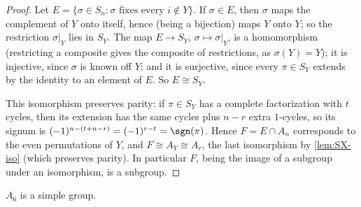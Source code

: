 \begin{proof}
	Let \(E = \{\sigma \in S_n : \sigma \text{ fixes every } i \notin Y\}\). If
	\(\sigma \in E\), then \(\sigma\) maps the complement of \(Y\) onto itself, hence (being
	a bijection) maps \(Y\) onto \(Y\); so the restriction \(\sigma|_Y\) lies in \(S_Y\).
	The map \(E \to S_Y\), \(\sigma \mapsto \sigma|_Y\), is a homomorphism (restricting a
	composite gives the composite of restrictions, as \(\sigma(Y) = Y\)); it is injective,
	since \(\sigma\) is known off \(Y\); and it is surjective, since every \(\pi \in S_Y\)
	extends by the identity to an element of \(E\). So \(E \cong S_Y\).

	This isomorphism preserves parity: if \(\pi \in S_Y\) has a complete factorization with
	\(t\) cycles, then its extension has the same cycles plus \(n - r\) extra \(1\)-cycles,
	so its signum is \((-1)^{n-(t+n-r)} = (-1)^{r-t} = \sgn(\pi)\). Hence
	\(F = E \cap A_n\) corresponds to the even permutations of \(Y\), and
	\(F \cong A_Y \cong A_r\), the last isomorphism by \autoref{lem:SX-iso} (which preserves
	parity). In particular \(F\), being the image of a subgroup under an isomorphism, is a
	subgroup.
\end{proof}

\begin{lemma}\label{lem:A6-simple}
	\(A_6\) is a simple group.
\end{lemma}

